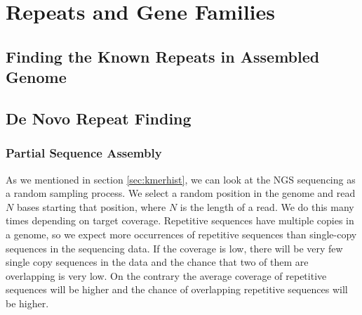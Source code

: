 \chapter{Repeats and Gene Families}\label{chap:repeatsfamilies}

\cite{venner2009dynamics}

\section{Finding the Known Repeats in Assembled Genome}


\section{De Novo Repeat Finding}


\subsection{Partial Sequence Assembly}

As we mentioned in section \ref{sec:kmerhist}, we can look at the NGS sequencing as a random sampling process. We select a random position in the genome and read $N$ bases starting that position, where $N$ is the length of a read. We do this many times depending on target coverage.
Repetitive sequences have multiple copies in a genome, so we expect more occurrences of repetitive sequences than single-copy sequences in the sequencing data. If the coverage is low, there will be very few single copy sequences in the data and the chance that two of them are overlapping is very low. On the contrary the average coverage of repetitive sequences will be higher and the chance of overlapping repetitive sequences will be higher.

